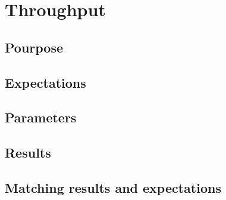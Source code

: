 \section{Throughput}

	\subsection{Pourpose}

	\subsection{Expectations}

	\subsection{Parameters}

	\subsection{Results}

	\subsection{Matching results and expectations}


